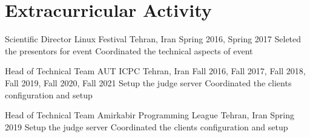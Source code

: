 \section{Extracurricular Activity}


\cventry%
  {Scientific Director}
  {Linux Festival}
  {}
  {Tehran, Iran}
  {Spring 2016, Spring 2017}
  {%
      Seleted the presentors for event
      Coordinated the technical aspects of event
  }

\cventry%
  {Head of Technical Team}
  {AUT ICPC}
  {}
  {Tehran, Iran}
  {Fall 2016, Fall 2017, Fall 2018, Fall 2019, Fall 2020, Fall 2021}
  {%
      Setup the judge server
      Coordinated the clients configuration and setup
  }

\cventry%
  {Head of Technical Team}
  {Amirkabir Programming League}
  {}
  {Tehran, Iran}
  {Spring 2019}
  {%
      Setup the judge server
      Coordinated the clients configuration and setup
  }
